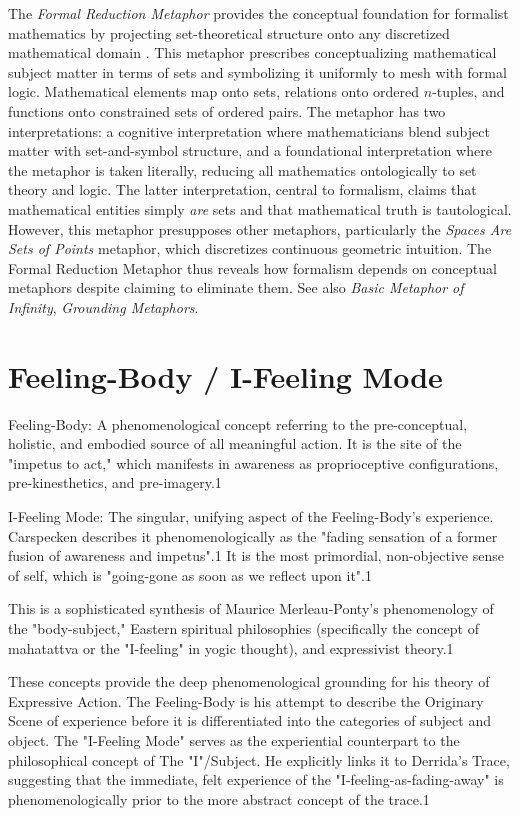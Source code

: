 \documentclass{book}
\begin{document}
The \textit{Formal Reduction Metaphor} provides the conceptual foundation for formalist mathematics by projecting set-theoretical structure onto any discretized mathematical domain \parencite{Lakoff2000}. This metaphor prescribes conceptualizing mathematical subject matter in terms of sets and symbolizing it uniformly to mesh with formal logic. Mathematical elements map onto sets, relations onto ordered $n$-tuples, and functions onto constrained sets of ordered pairs. The metaphor has two interpretations: a cognitive interpretation where mathematicians blend subject matter with set-and-symbol structure, and a foundational interpretation where the metaphor is taken literally, reducing all mathematics ontologically to set theory and logic. The latter interpretation, central to formalism, claims that mathematical entities simply \textit{are} sets and that mathematical truth is tautological. However, this metaphor presupposes other metaphors, particularly the \textit{Spaces Are Sets of Points} metaphor, which discretizes continuous geometric intuition. The Formal Reduction Metaphor thus reveals how formalism depends on conceptual metaphors despite claiming to eliminate them. See also \textit{Basic Metaphor of Infinity}, \textit{Grounding Metaphors}.


\section{Feeling-Body / I-Feeling Mode}

\textit{}

Feeling-Body: A phenomenological concept referring to the pre-conceptual, holistic, and embodied source of all meaningful action. It is the site of the "impetus to act," which manifests in awareness as proprioceptive configurations, pre-kinesthetics, and pre-imagery.1

I-Feeling Mode: The singular, unifying aspect of the Feeling-Body's experience. Carspecken describes it phenomenologically as the "fading sensation of a former fusion of awareness and impetus".1 It is the most primordial, non-objective sense of self, which is "going-gone as soon as we reflect upon it".1

This is a sophisticated synthesis of Maurice Merleau-Ponty's phenomenology of the "body-subject," Eastern spiritual philosophies (specifically the concept of mahatattva or the "I-feeling" in yogic thought), and expressivist theory.1

These concepts provide the deep phenomenological grounding for his theory of Expressive Action. The Feeling-Body is his attempt to describe the Originary Scene of experience before it is differentiated into the categories of subject and object. The "I-Feeling Mode" serves as the experiential counterpart to the philosophical concept of The "I"/Subject. He explicitly links it to Derrida's Trace, suggesting that the immediate, felt experience of the "I-feeling-as-fading-away" is phenomenologically prior to the more abstract concept of the trace.1
\end{document}
